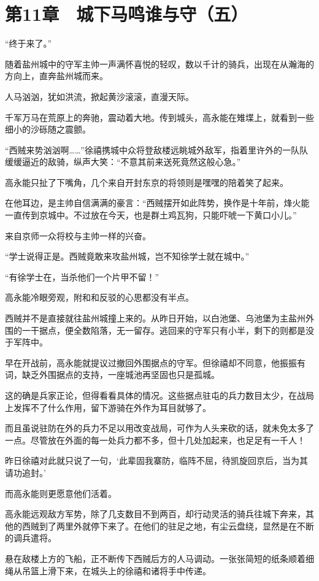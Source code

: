 \section{第11章　城下马鸣谁与守（五）}

“终于来了。”

随着盐州城中的守军主帅一声满怀喜悦的轻叹，数以千计的骑兵，出现在从瀚海的方向上，直奔盐州城而来。

人马汹汹，犹如洪流，掀起黄沙滚滚，直漫天际。

千军万马在荒原上的奔驰，震动着大地。传到城头，高永能在雉堞上，就看到一些细小的沙砾随之震颤。

“西贼来势汹汹啊……”徐禧携城中众将登敌楼远眺城外敌军，指着里许外的一队队缓缓逼近的敌骑，纵声大笑：“不意其前来送死竟然这般心急。”

高永能只扯了下嘴角，几个来自开封东京的将领则是嘿嘿的陪着笑了起来。

在他耳边，是主帅自信满满的豪言：“西贼摆开如此阵势，换作是十年前，烽火能一直传到京城中。不过放在今天，也是群土鸡瓦狗，只能吓唬一下黄口小儿。”

来自京师一众将校与主帅一样的兴奋。

“学士说得正是。西贼竟敢来攻盐州城，岂不知徐学士就在城中。”

“有徐学士在，当杀他们一个片甲不留！”

高永能冷眼旁观，附和和反驳的心思都没有半点。

西贼并不是直接就往盐州城撞上来的。从昨日开始，以白池堡、乌池堡为主盐州外围的一干据点，便全数陷落，无一留存。逃回来的守军只有小半，剩下的则都是没于军阵中。

早在开战前，高永能就提议过撤回外围据点的守军。但徐禧却不同意，他振振有词，缺乏外围据点的支持，一座城池再坚固也只是孤城。

这的确是兵家正论，但得看看具体的情况。这些据点驻屯的兵力数目太少，在战局上发挥不了什么作用，留下游骑在外作为耳目就够了。

而且虽说驻防在外的兵力不足以用改变战局，可作为人头来砍的话，就未免太多了一点。尽管放在外面的每一处兵力都不多，但十几处加起来，也足足有一千人！

昨日徐禧对此就只说了一句，‘此辈固我寨防，临阵不屈，待凯旋回京后，当为其请功追封。’

而高永能则更愿意他们活着。

高永能远观敌方军势，除了几支数目不到两百，却行动灵活的骑兵往城下奔来，其他的西贼到了两里外就停下来了。在他们的驻足之地，有尘云盘绕，显然是在不断的调兵遣将。

悬在敌楼上方的飞船，正不断传下西贼后方的人马调动。一张张简短的纸条顺着细绳从吊篮上滑下来，在城头上的徐禧和诸将手中传递。

